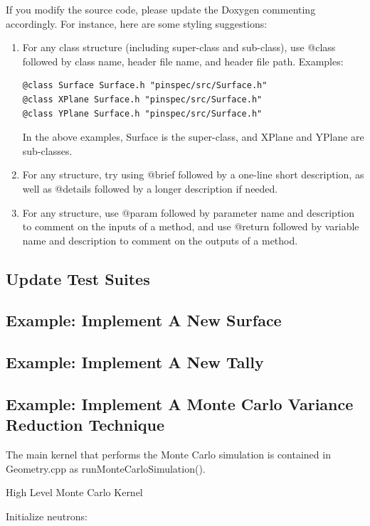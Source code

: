 \documentclass[titlepage]{article}
\begin{document}
If you modify the source code, please update the Doxygen commenting accordingly. For instance, here are some styling suggestions:
\begin{enumerate}
\item For any class structure (including super-class and sub-class), use @class followed by class name, header file name, and header file path. Examples:
\begin{verbatim}
@class Surface Surface.h "pinspec/src/Surface.h"
@class XPlane Surface.h "pinspec/src/Surface.h"
@class YPlane Surface.h "pinspec/src/Surface.h"
\end{verbatim}
In the above examples, Surface is the super-class, and XPlane and YPlane are sub-classes. 

\item For any structure, try using @brief followed by a one-line short description, as well as @details followed by a longer description if needed. 

\item For any structure, use @param followed by parameter name and description to comment on the inputs of a method, and use @return followed by variable name and description to comment on the outputs of a method. 
\end{enumerate}


\clearpage
\subsection{Update Test Suites}

\clearpage
\subsection{Example: Implement A New Surface}

\clearpage
\subsection{Example: Implement A New Tally}


\clearpage
\subsection{Example: Implement A Monte Carlo Variance Reduction Technique}
The main kernel that performs the Monte Carlo simulation is contained in Geometry.cpp as runMonteCarloSimulation(). 

\begin{algorithm}

\caption{High Level Monte Carlo Kernel}
\begin{algorithmic}
\STATE Initialize neutrons:

\ENDFOR
\ENDFOR
\end{algorithmic}
\end{algorithm}
\end{document}
